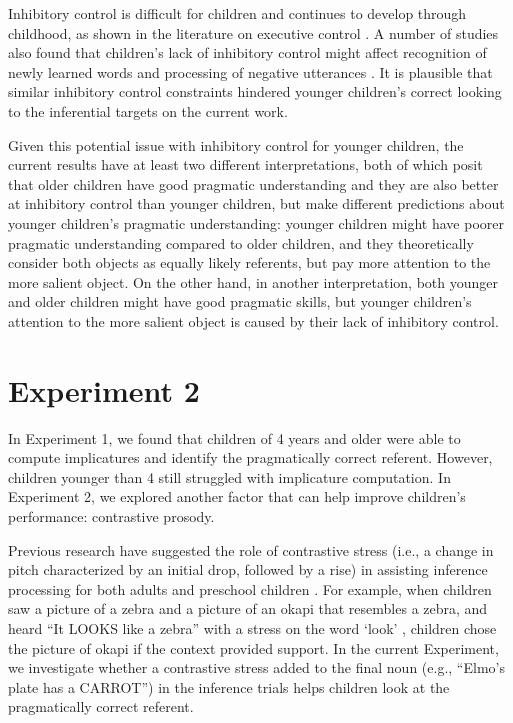 \documentclass[10pt,letterpaper]{article}
\begin{document}
Inhibitory control is difficult for children and continues to develop through childhood, as shown in the literature on executive control \cite{davidson2006development, gerardi2000sensitivity}. A number of studies also found that children's lack of inhibitory control might affect recognition of newly learned words \cite{yurovskybeyond} and processing of negative utterances \cite{nordmeyer2013measuring}. It is plausible that similar inhibitory control constraints hindered younger children's correct looking to the inferential targets on the current work. 

Given this potential issue with inhibitory control for younger children, the current results have at least two different interpretations, both of which posit that older children have good pragmatic understanding and they are also better at inhibitory control than younger children, but make different predictions about younger children's pragmatic understanding: younger children might have poorer pragmatic understanding compared to older children, and they theoretically consider both objects as equally likely referents, but pay more attention to the more salient object. On the other hand, in another interpretation, both younger and older children might have good pragmatic skills, but younger children's attention to the more salient object is caused by their lack of inhibitory control. 


\section{Experiment 2}

In Experiment 1, we found that children of 4 years and older were able to compute implicatures and identify the pragmatically correct referent. However, children younger than 4 still struggled with implicature computation. In Experiment 2, we explored another factor that can help improve children's performance: contrastive prosody.

Previous research have suggested the role of contrastive stress (i.e., a change in pitch characterized by an initial drop, followed by a rise) in assisting inference processing for both adults \cite{ito2008anticipatory} and preschool children \cite{kurumada1contextual}. For example, when children saw a picture of a zebra and a picture of an okapi that resembles a zebra, and heard ``It LOOKS like a zebra'' with a stress on the word `look' , children chose the picture of okapi if the context provided support. In the current Experiment, we investigate whether a contrastive stress added to the final noun (e.g., ``Elmo's plate has a CARROT'') in the inference trials helps children look at the pragmatically correct referent.
\end{document}
